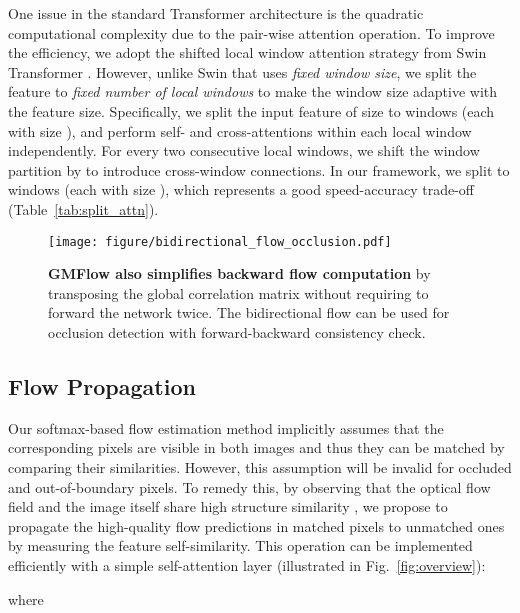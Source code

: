\documentclass[10pt,twocolumn,letterpaper]{article}
\begin{document}
One issue in the standard Transformer architecture \cite{vaswani2017attention} is the quadratic computational complexity due to the pair-wise attention operation. To improve the efficiency, we adopt the shifted local window attention strategy from Swin Transformer \cite{liu2021Swin}. However, unlike Swin that uses \emph{fixed window size}, we split the feature to \emph{fixed number of local windows} to make the window size adaptive with the feature size. Specifically, we split the input feature of size  to  windows (each with size ), and perform self- and cross-attentions within each local window independently. For every two consecutive local windows, we shift the window partition by  to introduce cross-window connections. In our framework, we split to  windows (each with size ), which represents a good speed-accuracy trade-off (Table~\ref{tab:split_attn}).



\begin{figure}[t]
    \centering
    \texttt{[image: figure/bidirectional\_flow\_occlusion.pdf]}
    \vspace{-6pt}
    \caption{\textbf{GMFlow also simplifies backward flow computation} by transposing the global correlation matrix without requiring to forward the network twice. The bidirectional flow can be used for occlusion detection with forward-backward consistency check.}
    \label{fig:bidir_flow}
    \vspace{-12pt}
\end{figure}




\subsection{Flow Propagation}
Our softmax-based flow estimation method implicitly assumes that the corresponding pixels are visible in both images and thus they can be matched by comparing their similarities. However, this assumption will be invalid for occluded and out-of-boundary pixels. To remedy this, by observing that the optical flow field and the image itself share high structure similarity \cite{hui2020liteflownet3,Jiang_2021_ICCV}, we propose to propagate the high-quality flow predictions in matched pixels to unmatched ones by measuring the feature self-similarity. This operation can be implemented efficiently with a simple self-attention layer (illustrated in Fig.~\ref{fig:overview}):

where
\end{document}
